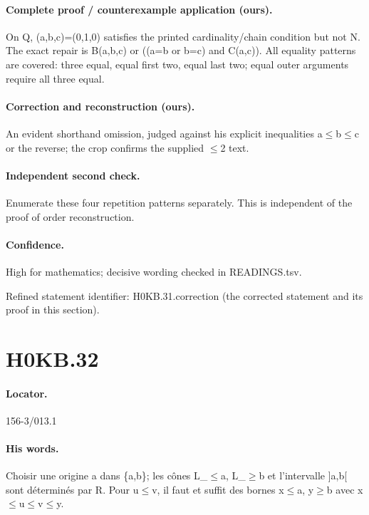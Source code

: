 \paragraph{Complete proof / counterexample application (ours).} On Q, (a,b,c)=(0,1,0) satisfies the printed cardinality/chain condition but not N. The exact repair is B(a,b,c) or ((a=b or b=c) and C(a,c)). All equality patterns are covered: three equal, equal first two, equal last two; equal outer arguments require all three equal.

\paragraph{Correction and reconstruction (ours).} An evident shorthand omission, judged against his explicit inequalities a\ensuremath{\leq}b\ensuremath{\leq}c or the reverse; the crop confirms the supplied \ensuremath{\leq}2 text.

\paragraph{Independent second check.} Enumerate these four repetition patterns separately. This is independent of the proof of order reconstruction.

\paragraph{Confidence.} High for mathematics; decisive wording checked in READINGS.tsv.

\noindent Refined statement identifier: H0KB.31.correction (the corrected statement and its proof in this section).

\section*{H0KB.32}\label{statement:H0KB.32}
\paragraph{Locator.} 156-3/013.1

\paragraph{His words.} Choisir une origine a dans \{a,b\}; les cônes L\_\ensuremath{\leq}a, L\_\ensuremath{\geq}b et l’intervalle ]a,b[ sont déterminés par R. Pour u\ensuremath{\leq}v, il faut et suffit des bornes x\ensuremath{\leq}a, y\ensuremath{\geq}b avec x\ensuremath{\leq}u\ensuremath{\leq}v\ensuremath{\leq}y.

